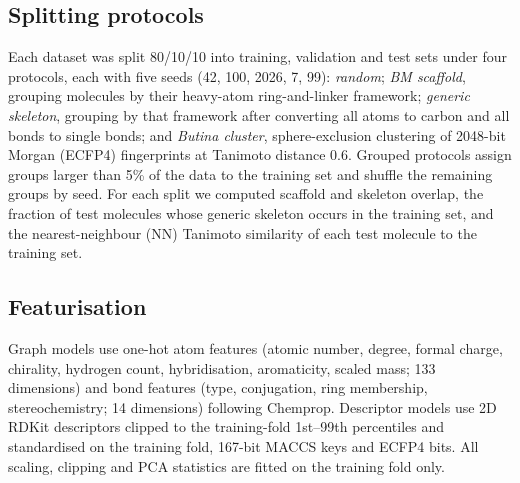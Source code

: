 \documentclass[journal=jcisd8,manuscript=article]{achemso}
\begin{document}
\subsection{Splitting protocols}
Each dataset was split 80/10/10 into training, validation and test sets under four protocols, each with five seeds (42, 100, 2026, 7, 99): \emph{random}; \emph{BM scaffold}\cite{bemis1996properties}, grouping molecules by their heavy-atom ring-and-linker framework; \emph{generic skeleton}, grouping by that framework after converting all atoms to carbon and all bonds to single bonds; and \emph{Butina cluster}\cite{butina1999unsupervised}, sphere-exclusion clustering of 2048-bit Morgan (ECFP4\cite{rogers2010extended}) fingerprints at Tanimoto distance 0.6. Grouped protocols assign groups larger than 5\% of the data to the training set and shuffle the remaining groups by seed. For each split we computed scaffold and skeleton overlap, the fraction of test molecules whose generic skeleton occurs in the training set, and the nearest-neighbour (NN) Tanimoto similarity of each test molecule to the training set.

\subsection{Featurisation}
Graph models use one-hot atom features (atomic number, degree, formal charge, chirality, hydrogen count, hybridisation, aromaticity, scaled mass; 133 dimensions) and bond features (type, conjugation, ring membership, stereochemistry; 14 dimensions) following Chemprop\cite{yang2019analyzing,heid2024chemprop}. Descriptor models use 2D RDKit descriptors clipped to the training-fold 1st--99th percentiles and standardised on the training fold, 167-bit MACCS keys\cite{durant2002reoptimization} and ECFP4 bits. All scaling, clipping and PCA statistics are fitted on the training fold only.
\end{document}
